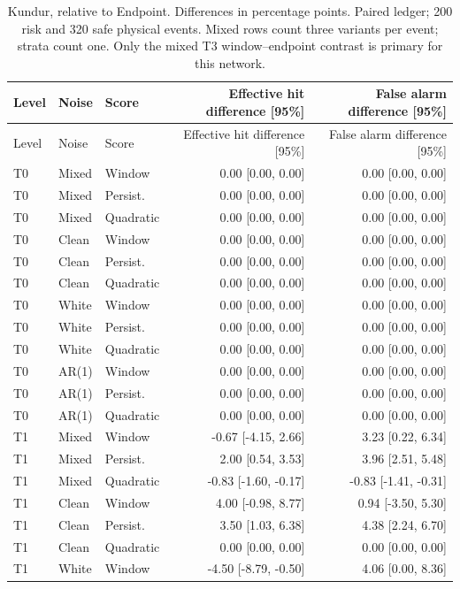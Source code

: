 \documentclass[10pt]{article}
\begin{document}
\begin{longtable}{lllrr}
\caption{Kundur, relative to Endpoint. Differences in percentage points. Paired ledger; 200 risk and 320 safe physical events. Mixed rows count three variants per event; strata count one. Only the mixed T3 window--endpoint contrast is primary for this network.}\\
\toprule Level & Noise & Score & Effective hit difference [95\%] & False alarm difference [95\%] \\\midrule\endfirsthead
\toprule Level & Noise & Score & Effective hit difference [95\%] & False alarm difference [95\%] \\\midrule\endhead
T0 & Mixed & Window & 0.00 [0.00, 0.00] & 0.00 [0.00, 0.00] \\
T0 & Mixed & Persist. & 0.00 [0.00, 0.00] & 0.00 [0.00, 0.00] \\
T0 & Mixed & Quadratic & 0.00 [0.00, 0.00] & 0.00 [0.00, 0.00] \\
T0 & Clean & Window & 0.00 [0.00, 0.00] & 0.00 [0.00, 0.00] \\
T0 & Clean & Persist. & 0.00 [0.00, 0.00] & 0.00 [0.00, 0.00] \\
T0 & Clean & Quadratic & 0.00 [0.00, 0.00] & 0.00 [0.00, 0.00] \\
T0 & White & Window & 0.00 [0.00, 0.00] & 0.00 [0.00, 0.00] \\
T0 & White & Persist. & 0.00 [0.00, 0.00] & 0.00 [0.00, 0.00] \\
T0 & White & Quadratic & 0.00 [0.00, 0.00] & 0.00 [0.00, 0.00] \\
T0 & AR(1) & Window & 0.00 [0.00, 0.00] & 0.00 [0.00, 0.00] \\
T0 & AR(1) & Persist. & 0.00 [0.00, 0.00] & 0.00 [0.00, 0.00] \\
T0 & AR(1) & Quadratic & 0.00 [0.00, 0.00] & 0.00 [0.00, 0.00] \\
T1 & Mixed & Window & -0.67 [-4.15, 2.66] & 3.23 [0.22, 6.34] \\
T1 & Mixed & Persist. & 2.00 [0.54, 3.53] & 3.96 [2.51, 5.48] \\
T1 & Mixed & Quadratic & -0.83 [-1.60, -0.17] & -0.83 [-1.41, -0.31] \\
T1 & Clean & Window & 4.00 [-0.98, 8.77] & 0.94 [-3.50, 5.30] \\
T1 & Clean & Persist. & 3.50 [1.03, 6.38] & 4.38 [2.24, 6.70] \\
T1 & Clean & Quadratic & 0.00 [0.00, 0.00] & 0.00 [0.00, 0.00] \\
T1 & White & Window & -4.50 [-8.79, -0.50] & 4.06 [0.00, 8.36] \\

\end{longtable}
\end{document}
